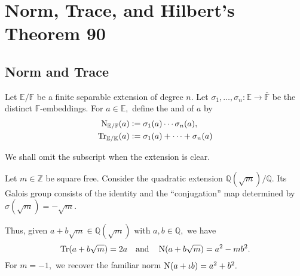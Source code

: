 \chapter{Norm, Trace, and Hilbert's Theorem 90}

\section{Norm and Trace}
\begin{defn} \label{defn:normtrace}
	Let $\mathbb{E}/\mathbb{F}$ be a finite separable extension of degree $n.$ Let $\sigma_1, \ldots, \sigma_n : \mathbb{E} \to \overline{\mathbb{F}}$ be the distinct $\mathbb{F}$-embeddings. For $a \in \mathbb{E},$ define the  and  of $a$ by
	\begin{align*} 
		\operatorname{N}_{\mathbb{E}/\mathbb{F}}(a) &\vcentcolon= \sigma_1(a) \cdots \sigma_n(a), \\
		\operatorname{Tr}_{\mathbb{E}/\mathbb{K}}(a) &\vcentcolon= \sigma_1(a) + \cdots + \sigma_n(a)
	\end{align*}
\end{defn}

We shall omit the subscript when the extension is clear.

\begin{ex}
	Let $m \in \mathbb{Z}$ be square free. Consider the quadratic extension $\mathbb{Q}(\sqrt{m})/\mathbb{Q}.$ Its Galois group consists of the identity and the ``conjugation'' map determined by $\sigma(\sqrt{m}) = -\sqrt{m}.$ 

	Thus, given $a + b\sqrt{m} \in \mathbb{Q}(\sqrt{m})$ with $a, b \in \mathbb{Q},$ we have
	\begin{equation*} 
		\operatorname{Tr}(a + b\sqrt{m}) = 2a \quad\text{and}\quad \operatorname{N}(a + b\sqrt{m}) = a^2 - mb^2.
	\end{equation*}
	For $m = -1,$ we recover the familiar norm $\operatorname{N}(a + \iota b) = a^2 + b^2.$
\end{ex}

